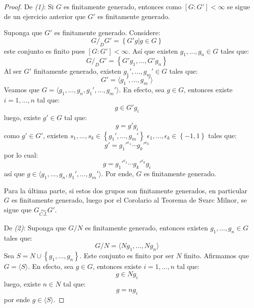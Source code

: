 \documentclass[12pt]{report}
\newcounter{it}
\theoremstyle{largebreak}
\newcommand{\gen}[1]{\ensuremath{\langle#1\rangle}}
\newcommand{\qisom}{\ensuremath{\underset{C.I.}{\sim}}}
\begin{document}
    \begin{proof}
        De \textit{(1)}: Si $G$ es finitamente generado, entonces como $[G:G']<\infty$ se sigue de un ejercicio anterior que $G'$ es finitamente generado.

        Suponga que $G'$ es finitamente generado. Considere:
        \begin{equation*}
            G/_DG'=\left\{G'g\Big|g\in G \right\}
        \end{equation*}
        este conjunto es finito pues $[G:G']<\infty$. Así que existen $g_1,...,g_n\in G$ tales que:
        \begin{equation*}
            G/_DG'=\left\{G'g_1,...,G'g_n \right\}
        \end{equation*}
        Al ser $G'$ finitamente generado, existen $g_1',...,g_m'\in G$ tales que:
        \begin{equation*}
            G'=\gen{g_1',...,g_m'}
        \end{equation*}
        Veamos que $G=\gen{g_1,...,g_n,g_1',...,g_m'}$. En efecto, sea $g\in G$, entonces existe $i=1,...,n$ tal que:
        \begin{equation*}
            g\in G'g_i
        \end{equation*}
        luego, existe $g'\in G$ tal que:
        \begin{equation*}
            g=g'g_i
        \end{equation*}
        como $g'\in G'$, existen $s_1,...,s_k\in\left\{g_1',...,g_m' \right\}$ $\epsilon_1,...,\epsilon_k\in\left\{-1,1\right\}$ tales que:
        \begin{equation*}
            g'=g_1'^{\epsilon_1}\cdots g_k'^{\epsilon_k}
        \end{equation*}
        por lo cual:
        \begin{equation*}
            g=g_1'^{\epsilon_1}\cdots g_k'^{\epsilon_k}g_i
        \end{equation*}
        así que $g\in\gen{g_1,...,g_n,g_1',...,g_m'}$. Por ende, $G$ es finitamente generado.

        Para la última parte, si estos dos grupos son finitamente generados, en particular $G$ es finitamente generado, luego por el Corolario al Teorema de Svarc Milnor, se sigue que $G\qisom G'$.

        De \textit{(2)}: Suponga que $G/N$ es finitamente generado, entonces existen $g_1,...,g_n\in G$ tales que:
        \begin{equation*}
            G/N=\gen{Ng_1,...,Ng_n}
        \end{equation*}
        Sea $S=N\cup\left\{g_1,...,g_n\right\}$. Este conjunto es finito por ser $N$ finito. Afirmamos que $G=\gen{S}$. En efecto, sea $g\in G$, entonces existe $i=1,...,n$ tal que:
        \begin{equation*}
            g\in Ng_i
        \end{equation*}
        luego, existe $n\in N$ tal que:
        \begin{equation*}
            g=ng_i
        \end{equation*}
        por ende $g\in\gen{S}$.


\end{proof}
\end{document}
